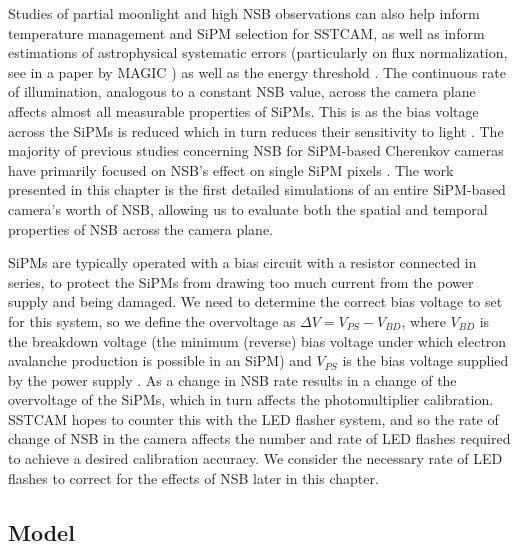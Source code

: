 Studies of partial moonlight and high NSB observations can also help inform temperature management and SiPM selection for SSTCAM, as well as inform estimations of astrophysical systematic errors (particularly on flux normalization, see in a paper by MAGIC \cite{magicmoon}) as well as the energy threshold \cite{magicmoon}. The continuous rate of illumination, analogous to a constant NSB value, across the camera plane affects almost all measurable properties of SiPMs. This is as the bias voltage across the SiPMs is reduced which in turn reduces their sensitivity to light \cite{1mhighnsb}. The majority of previous studies concerning NSB for SiPM-based Cherenkov cameras have primarily focused on NSB's effect on single SiPM pixels \cite{1mhighnsb} \cite{2msipm} \cite{1mcalib} \cite{lstnsb}. The work presented in this chapter is the first detailed simulations of an entire SiPM-based camera's worth of NSB, allowing us to evaluate both the spatial and temporal properties of NSB across the camera plane.

SiPMs are typically operated with a bias circuit with a resistor connected in series, to protect the SiPMs from drawing too much current from the power supply and being damaged. We need to determine the correct bias voltage to set for this system, so we define the overvoltage as $\Delta V=V_{PS}-V_{BD}$, where $V_{BD}$ is the breakdown voltage (the minimum (reverse) bias voltage under which electron avalanche production is possible in an SiPM) and $V_{PS}$ is the bias voltage supplied by the power supply \cite{1mhighnsb}. As a change in NSB rate results in a change of the overvoltage of the SiPMs, which in turn affects the photomultiplier calibration. SSTCAM hopes to counter this with the LED flasher system, and so the rate of change of NSB in the camera affects the number and rate of LED flashes required to achieve a desired calibration accuracy. We consider the necessary rate of LED flashes to correct for the effects of NSB later in this chapter.
\subsection{Model}
\label{sec:intro:model}

